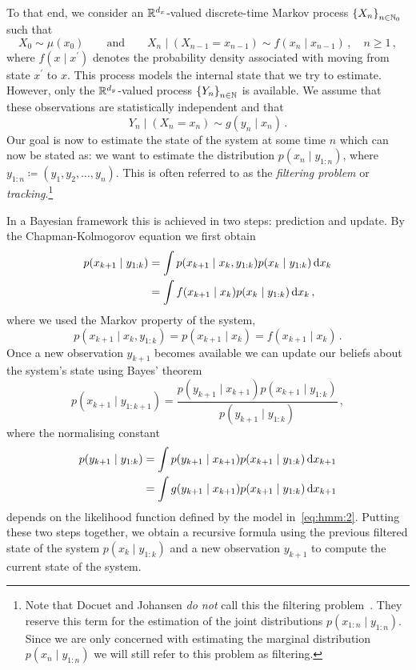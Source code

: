 To that end, we consider an $\mathbb{R}^{d_x}$-valued discrete-time Markov
process ${\{X_n\}}_{n \in \mathbb{N}_0}$ such that
\begin{equation}
  \label{eq:hmm:1}
  X_0 \sim \mu(x_0) \qquad \text{and} \qquad X_n \mid (X_{n-1} = x_{n-1}) \sim f(x_n \mid x_{n-1})\,, \quad n \ge 1\,,
\end{equation}
where $f(x \mid x^\prime)$ denotes the probability density associated
with moving from state $x^\prime$ to $x$. This process models the
internal state that we try to estimate. However, only the
$\mathbb{R}^{d_y}$-valued process ${\{Y_n\}}_{n \in \mathbb{N}}$ is available. We
assume that these observations are statistically independent and that
\begin{equation}
  \label{eq:hmm:2}
  Y_n \mid (X_n = x_n) \sim g(y_n \mid x_n) \,.
\end{equation}
Our goal is now to estimate the state of the system at some time $n$
which can now be stated as: we want to estimate the distribution
$p(x_n \mid y_{1:n})$, where
$y_{1:n} \coloneqq (y_1, y_2, \dotsc, y_n)$. This is often referred to
as the \emph{filtering problem} or \emph{tracking}.\footnote{Note that
  Docuet and Johansen \emph{do not} call this the filtering
  problem~\cite{doucet}. They reserve this term for the estimation of
  the joint distributions $p(x_{1:n} \mid y_{1:n} )$. Since we are
  only concerned with estimating the marginal distribution
  $p(x_n \mid y_{1:n} )$ we will still refer to this problem as
  filtering.}

In a Bayesian framework this is achieved in two steps: prediction and
update. By the Chapman-Kolmogorov equation we first obtain
\begin{align*}
  p(x_{k+1} \mid y_{1:k}) &= \int p(x_{k+1} \mid x_k, y_{1:k}) p(x_k \mid y_{1:k}) \,\mathrm{d}x_k \\
                          &= \int f(x_{k+1} \mid x_k) p(x_k \mid y_{1:k}) \,\mathrm{d}x_k \,,
\end{align*}
where we used the Markov property of the system, \ie
\[
  p(x_{k+1} \mid x_k, y_{1:k}) = p(x_{k+1} \mid x_k) = f(x_{k+1} \mid
  x_k) \,.
\]
Once a new observation $y_{k+1}$ becomes available we can update our
beliefs about the system's state using Bayes' theorem
\[
  p(x_{k+1} \mid y_{1:k+1}) = \frac{ p(y_{k+1} \mid x_{k+1}) p(x_{k+1}
    \mid y_{1:k}) }{ p(y_{k+1} \mid y_{1:k}) }\,,
\]
where the normalising constant
\begin{align*}
  p(y_{k+1} \mid y_{1:k}) &= \int p(y_{k+1} \mid x_{k+1}) p(x_{k+1} \mid y_{1:k}) \,\mathrm{d}x_{k+1} \\
                          &= \int g(y_{k+1} \mid x_{k+1}) p(x_{k+1} \mid y_{1:k}) \,\mathrm{d}x_{k+1}
\end{align*}
depends on the likelihood function defined by the model
in~\eqref{eq:hmm:2}. Putting these two steps together, we obtain a
recursive formula using the previous filtered state of the system
$p(x_{k} \mid y_{1:k})$ and a new observation $y_{k+1}$ to compute the
current state of the system.

